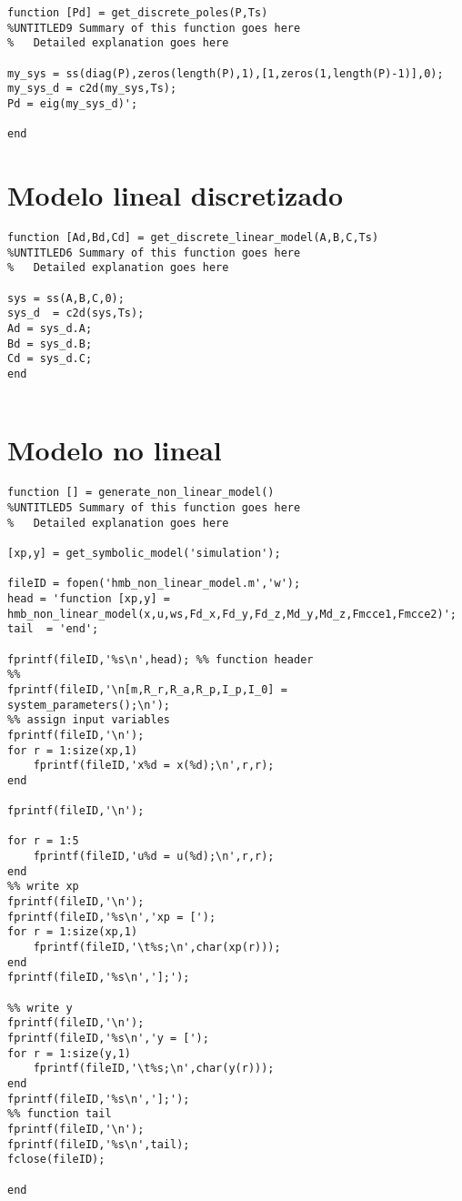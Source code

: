 \begin{lstlisting}[frame=single]
function [Pd] = get_discrete_poles(P,Ts)
%UNTITLED9 Summary of this function goes here
%   Detailed explanation goes here

my_sys = ss(diag(P),zeros(length(P),1),[1,zeros(1,length(P)-1)],0);
my_sys_d = c2d(my_sys,Ts);
Pd = eig(my_sys_d)';

end

\end{lstlisting}
 
\section{Modelo lineal discretizado}

\begin{lstlisting}[frame=single]
function [Ad,Bd,Cd] = get_discrete_linear_model(A,B,C,Ts)
%UNTITLED6 Summary of this function goes here
%   Detailed explanation goes here

sys = ss(A,B,C,0); 
sys_d  = c2d(sys,Ts);
Ad = sys_d.A;
Bd = sys_d.B;
Cd = sys_d.C;
end


\end{lstlisting}
 
\section{Modelo no lineal}

\begin{lstlisting}[frame=single]
function [] = generate_non_linear_model()
%UNTITLED5 Summary of this function goes here
%   Detailed explanation goes here

[xp,y] = get_symbolic_model('simulation');

fileID = fopen('hmb_non_linear_model.m','w');
head = 'function [xp,y] =
hmb_non_linear_model(x,u,ws,Fd_x,Fd_y,Fd_z,Md_y,Md_z,Fmcce1,Fmcce2)';
tail  = 'end';

fprintf(fileID,'%s\n',head); %% function header
%%
fprintf(fileID,'\n[m,R_r,R_a,R_p,I_p,I_0] = 
system_parameters();\n');
%% assign input variables
fprintf(fileID,'\n');
for r = 1:size(xp,1)
    fprintf(fileID,'x%d = x(%d);\n',r,r);
end

fprintf(fileID,'\n');

for r = 1:5
    fprintf(fileID,'u%d = u(%d);\n',r,r);
end
%% write xp
fprintf(fileID,'\n');
fprintf(fileID,'%s\n','xp = [');
for r = 1:size(xp,1)
    fprintf(fileID,'\t%s;\n',char(xp(r)));    
end
fprintf(fileID,'%s\n','];');

%% write y
fprintf(fileID,'\n');
fprintf(fileID,'%s\n','y = [');
for r = 1:size(y,1)
    fprintf(fileID,'\t%s;\n',char(y(r)));
end
fprintf(fileID,'%s\n','];');
%% function tail
fprintf(fileID,'\n');
fprintf(fileID,'%s\n',tail);
fclose(fileID);

end


\end{lstlisting}

